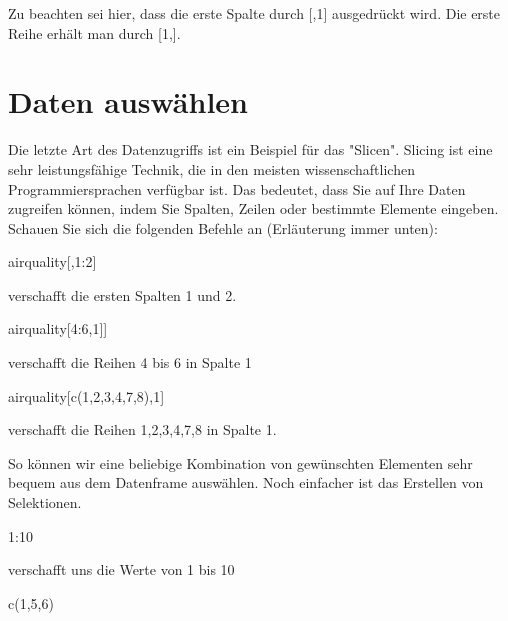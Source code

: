 \documentclass[a4paper,twoside]{tufte-book}\usepackage[]{graphicx}\usepackage[]{color}
\begin{document}
\begin{appendices}
Zu beachten sei hier, dass die erste Spalte durch [,1] ausgedrückt wird. Die erste Reihe erhält man durch [1,].

\section{Daten auswählen}

Die letzte Art des Datenzugriffs ist ein Beispiel für das "Slicen". Slicing ist eine sehr leistungsfähige Technik, die in den meisten wissenschaftlichen Programmiersprachen verfügbar ist. Das bedeutet, dass Sie auf Ihre Daten zugreifen können, indem Sie Spalten, Zeilen oder bestimmte Elemente eingeben. Schauen Sie sich die folgenden Befehle an (Erläuterung immer unten):

\begin{Schunk}
\begin{Sinput}
airquality[,1:2]
\end{Sinput}
\end{Schunk}

verschafft die ersten Spalten 1 und 2.


\begin{Schunk}
\begin{Sinput}
airquality[4:6,1]]
\end{Sinput}
\end{Schunk}

verschafft die Reihen 4 bis 6 in Spalte 1


\begin{Schunk}
\begin{Sinput}
airquality[c(1,2,3,4,7,8),1]
\end{Sinput}
\end{Schunk}

verschafft die Reihen 1,2,3,4,7,8 in Spalte 1. 

So können wir eine beliebige Kombination von gewünschten Elementen sehr bequem aus dem Datenframe auswählen. Noch einfacher ist das Erstellen von Selektionen.


\begin{Schunk}
\begin{Sinput}
1:10
\end{Sinput}
\end{Schunk}

verschafft uns die Werte von 1 bis 10

\begin{Schunk}
\begin{Sinput}
c(1,5,6)
\end{Sinput}
\end{Schunk}


\end{appendices}
\end{document}
